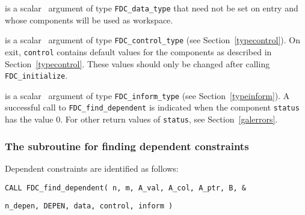 \documentclass{galahad}
\newcommand{\packagename}{FDC}
\begin{document}
\vspace*{1mm}
\begin{description}

 is a scalar \intentinout\ argument of type
{\tt \packagename\_data\_type}
that need not be set on entry and whose components will be used as workspace.

 is a scalar \intentout\ argument of type
{\tt \packagename\_control\_type}
(see Section~\ref{typecontrol}).
On exit, {\tt control} contains default values for the components as
described in Section~\ref{typecontrol}.
These values should only be changed after calling
{\tt \packagename\_initialize}.

 is a scalar \intentinout\ argument of type
{\tt \packagename\_inform\_type}
(see Section~\ref{typeinform}). A successful call to
{\tt \packagename\_find\_dependent}
is indicated when the  component {\tt status} has the value 0.
For other return values of {\tt status}, see Section~\ref{galerrors}.

\end{description}


\subsubsection{The subroutine for finding dependent constraints}
Dependent constraints are identified as follows:

\vspace*{1mm}

\hspace{8mm}
{\tt CALL \packagename\_find\_dependent( n, m, A\_val, A\_col, A\_ptr, B,
  \&}
\vspace*{-1mm}

\hspace{52mm}
{\tt    n\_depen, DEPEN, data, control, inform )}

\end{document}
